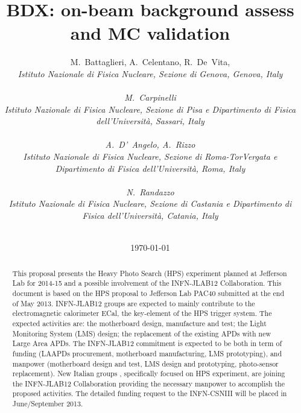 \documentclass[11pt]{report}
\begin{document}
\title{BDX: on-beam background assess and MC validation}

\author{
M.~Battaglieri,
A.~Celentano,
R.~De~Vita,\\
\it \small Istituto Nazionale di Fisica Nucleare, Sezione di Genova, Genova, Italy\\ \\
M.~Carpinelli\\
\it \small  Istituto Nazionale di Fisica Nucleare, Sezione di Pisa e Dipartimento di Fisica dell'Universit\`a, Sassari, Italy\\ \\
A.~D'~Angelo, A.~Rizzo\\
\it  \small Istituto Nazionale di Fisica Nucleare, Sezione di Roma-TorVergata e Dipartimento di Fisica dell'Universit\`a, Roma, Italy\\ \\
N.~Randazzo\\
\it  \small Istituto Nazionale di Fisica Nucleare, Sezione di Castania e Dipartimento di Fisica dell'Universit\`a, Catania, Italy\\ \\
}


\date{\today}
\maketitle

\begin{abstract}

This proposal presents the Heavy Photo Search (HPS) experiment planned at Jefferson Lab for 2014-15 and a possible involvement of the INFN-JLAB12 Collaboration. This document is based on the 
HPS proposal to Jefferson Lab PAC40 submitted at the end of May 2013. 
INFN-JLAB12 groups are expected to mainly contribute to the electromagnetic calorimeter ECal, the key-element of the HPS trigger system. 
The expected activities are: the motherboard design, manufacture and test; 
the  Light Monitoring System (LMS) design;  the replacement of the existing APDs with  new  Large Area APDs.
The INFN-JLAB12 commitment is expected to be both in term of funding (LAAPDs procurement, motherboard manufacturing, LMS prototyping),
 and manpower (motherboard design and test,  LMS design and prototyping,  photo-sensor replacement).
New Italian groups , specifically focused on HPS experiment, are joining the INFN-JLAB12 Collaboration
providing the necessary manpower to accomplish the proposed activities.
The detailed funding request to the INFN-CSNIII will be placed in June/September 2013. 

\end{abstract}
\end{document}
